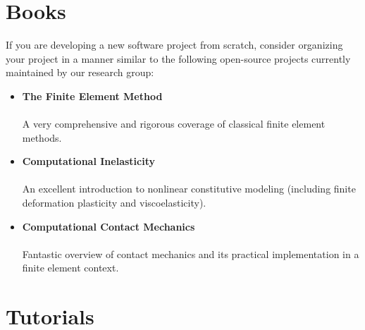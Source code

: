 \documentclass[12pt,a4paper,article,oneside]{memoir} %
\begin{document}

\section{Books}

If you are developing a new software project from scratch, consider organizing your project in a manner similar to the following open-source projects currently maintained by our research group:
\begin{itemize}
\item \textbf{The Finite Element Method} \\ \citep{hughes_2003} \\ A very comprehensive and rigorous coverage of classical finite element methods.
\item \textbf{Computational Inelasticity} \\ \citep{simo_1998} \\ An excellent introduction to nonlinear constitutive modeling (including finite deformation plasticity and viscoelasticity).
\item \textbf{Computational Contact Mechanics} \\ \citep{wriggers_2006} \\ Fantastic overview of contact mechanics and its practical implementation in a finite element context.
\end{itemize}


\section{Tutorials}
\end{document}
